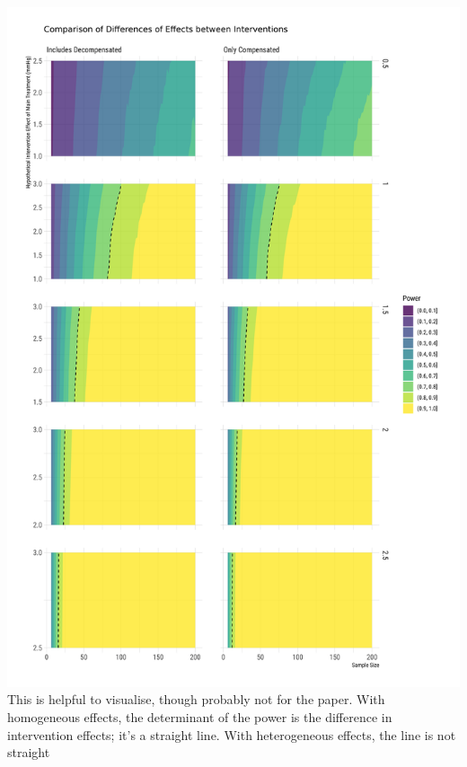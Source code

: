 \documentclass[
]{article}
\begin{document}
\includegraphics{figures/unnamed-chunk-78-2.png} This is helpful to
visualise, though probably not for the paper. With homogeneous effects,
the determinant of the power is the difference in intervention effects;
it's a straight line. With heterogeneous effects, the line is not
straight
\end{document}
